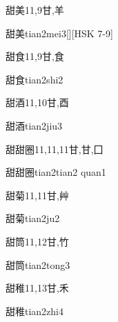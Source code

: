 \begin{Entry}{甜美}{11,9}{⽢,⽺}
  \begin{Phonetics}{甜美}{tian2mei3}[][HSK 7-9]
  \end{Phonetics}
\end{Entry}

\begin{Entry}{甜食}{11,9}{⽢,⾷}
  \begin{Phonetics}{甜食}{tian2shi2}
  \end{Phonetics}
\end{Entry}

\begin{Entry}{甜酒}{11,10}{⽢,⾣}
  \begin{Phonetics}{甜酒}{tian2jiu3}
  \end{Phonetics}
\end{Entry}

\begin{Entry}{甜甜圈}{11,11,11}{⽢,⽢,⼞}
  \begin{Phonetics}{甜甜圈}{tian2tian2 quan1}
  \end{Phonetics}
\end{Entry}

\begin{Entry}{甜菊}{11,11}{⽢,⾋}
  \begin{Phonetics}{甜菊}{tian2ju2}
  \end{Phonetics}
\end{Entry}

\begin{Entry}{甜筒}{11,12}{⽢,⽵}
  \begin{Phonetics}{甜筒}{tian2tong3}
  \end{Phonetics}
\end{Entry}

\begin{Entry}{甜稚}{11,13}{⽢,⽲}
  \begin{Phonetics}{甜稚}{tian2zhi4}
  \end{Phonetics}
\end{Entry}

